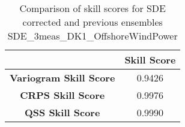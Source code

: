 
        \begin{table}[h!]
            \centering
            \begin{tabular}{|c|c|}
                \hline
                & \textbf{Skill Score}  \\
                \hline
                \textbf{Variogram Skill Score} & 0.9426  \\
                \hline
                \textbf{CRPS Skill Score} & 0.9976  \\
                \hline
                \textbf{QSS Skill Score} & 0.9990 \\
                \hline
            \end{tabular}
            \caption{Comparison of skill scores for SDE corrected and previous ensembles SDE_3meas_DK1_OffshoreWindPower}
            \label{table:skill_scores_comparison}
        \end{table}
        